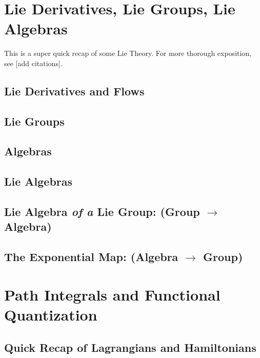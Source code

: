 \documentclass[11pt]{article}
\begin{document}
\newpage
\section{Lie Derivatives, Lie Groups, Lie Algebras}

This is a super quick recap of some Lie Theory. For more thorough exposition, see [add citations].

\subsection{Lie Derivatives and Flows}

\subsection{Lie Groups}

\subsection*{Algebras}

\subsection{Lie Algebras}

\subsection{Lie Algebra \emph{of a} Lie Group: (Group $\rightarrow$ Algebra)}


\subsection{The Exponential Map: (Algebra $\rightarrow$ Group)}

\newpage
\section{Path Integrals and Functional Quantization}

\vskip 0.5cm
\subsection{Quick Recap of Lagrangians and Hamiltonians}
\end{document}
